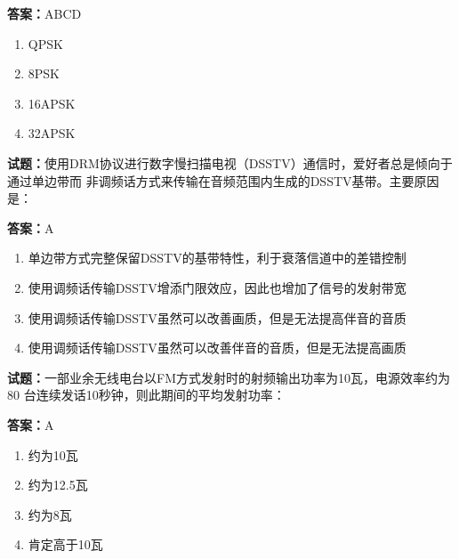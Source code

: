 \documentclass{ctexbook}
\begin{document}
\textbf{答案：}ABCD 

\begin{enumerate}[leftmargin=3em]
  \item QPSK 

  \item 8PSK 

  \item 16APSK 

  \item 32APSK 

\end{enumerate}





\vspace{1em}

\textbf{试题：}使用DRM协议进行数字慢扫描电视（DSSTV）通信时，爱好者总是倾向于通过单边带而
非调频话方式来传输在音频范围内生成的DSSTV基带。主要原因是： 

\textbf{答案：}A 

\begin{enumerate}[leftmargin=3em]
  \item 单边带方式完整保留DSSTV的基带特性，利于衰落信道中的差错控制 

  \item 使用调频话传输DSSTV增添门限效应，因此也增加了信号的发射带宽 

  \item 使用调频话传输DSSTV虽然可以改善画质，但是无法提高伴音的音质 

  \item 使用调频话传输DSSTV虽然可以改善伴音的音质，但是无法提高画质 

\end{enumerate}





\vspace{1em}

\textbf{试题：}一部业余无线电台以FM方式发射时的射频输出功率为10瓦，电源效率约为80%
台连续发话10秒钟，则此期间的平均发射功率： 

\textbf{答案：}A 

\begin{enumerate}[leftmargin=3em]
  \item 约为10瓦 

  \item 约为12.5瓦 

  \item 约为8瓦 

  \item 肯定高于10瓦 

\end{enumerate}
\end{document}
